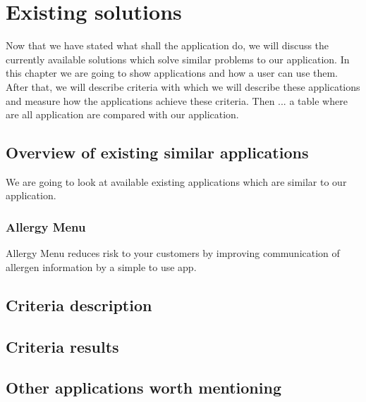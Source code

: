 \chapter{Existing solutions}
Now that we have stated what shall the application do, we will discuss the currently available solutions which solve similar problems to our application.
In this chapter we are going to show applications and how a user can use them.
After that, we will describe criteria with which we will describe these applications and measure how the applications achieve these criteria.
Then ... a table where are all application are compared with our application.

\section{Overview of existing similar applications}
We are going to look at available existing applications which are similar to our application.

\subsection{Allergy Menu}
Allergy Menu reduces risk to your customers by improving communication of allergen information by a simple to use app.
  

\section{Criteria description}

\section{Criteria results}

\section{Other applications worth mentioning}
